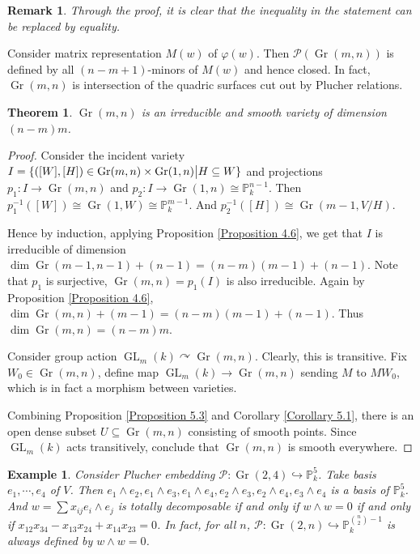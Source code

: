 \documentclass{ctexart}
\newtheorem{remark}{Remark}[section]
\newtheorem{theorem}{Theorem}[section]
\newtheorem{example}{Example}[section]
\newcommand{\grassmannianscheme}[2]{\operatorname{Gr}(#1, #2)}
\newcommand{\generallineargroup}[2]{\operatorname{GL}_{#1}(#2)}
\begin{document}
\begin{remark}
    Through the proof, it is clear that the inequality in the statement can be replaced by equality.
\end{remark}
Consider matrix representation $M(w)$ of $\varphi(w)$.
Then $\mathcal{P}(\grassmannianscheme{m}{n})$ is defined by all $(n - m + 1)$-minors of $M(w)$ and hence closed.
In fact, $\grassmannianscheme{m}{n}$ is intersection of the quadric surfaces cut out by Plucher relations.
\begin{theorem}
    $\grassmannianscheme{m}{n}$ is an irreducible and smooth variety of dimension $(n - m)m$.
    \label{Theorem 6.1}
\end{theorem}
\begin{proof}
    Consider the incident variety $I = \{([W], [H])\in \grassmannianscheme{m}{n} \times \grassmannianscheme{1}{n} \big{|} H \subseteq W\}$ and projections $p_{1}: I \rightarrow \grassmannianscheme{m}{n}$ and $p_{2}: I \rightarrow \grassmannianscheme{1}{n} \cong \mathbb{P}_{k}^{n - 1}$.
    Then $p_{1}^{-1}([W]) \cong \grassmannianscheme{1}{W} \cong \mathbb{P}_{k}^{m - 1}$.
    And $p_{2}^{-1}([H]) \cong \grassmannianscheme{m - 1}{V/H}$.
    \par
    Hence by induction, applying Proposition \ref{Proposition 4.6}, we get that $I$ is irreducible of dimension $\dim \grassmannianscheme{m - 1}{n - 1} + (n - 1) = (n - m)(m - 1) + (n - 1)$.
    Note that $p_{1}$ is surjective, $\grassmannianscheme{m}{n} = p_{1}(I)$ is also irreducible.
    Again by Proposition \ref{Proposition 4.6}, $\dim \grassmannianscheme{m}{n} + (m - 1) = (n - m)(m - 1) + (n - 1)$.
    Thus $\dim \grassmannianscheme{m}{n} = (n - m)m$.
    \par
    Consider group action $\generallineargroup{m}{k} \curvearrowright \grassmannianscheme{m}{n}$.
    Clearly, this is transitive.
    Fix $W_{0}\in \grassmannianscheme{m}{n}$, define map $\generallineargroup{m}{k} \rightarrow \grassmannianscheme{m}{n}$ sending $M$ to $MW_{0}$,
    which is in fact a morphism between varieties.
    \par
    Combining Proposition \ref{Proposition 5.3} and Corollary \ref{Corollary 5.1}, there is an open dense subset $U \subseteq \grassmannianscheme{m}{n}$ consisting of smooth points.
    Since $\generallineargroup{m}{k}$ acts transitively, conclude that $\grassmannianscheme{m}{n}$ is smooth everywhere.
\end{proof}
\begin{example}
    Consider Plucher embedding $\mathcal{P}: \grassmannianscheme{2}{4} \hookrightarrow \mathbb{P}_{k}^{5}$.
    Take basis $e_{1}, \cdots, e_{4}$ of $V$.
    Then $e_{1} \wedge e_{2}, e_{1} \wedge e_{3}, e_{1} \wedge e_{4}, e_{2} \wedge e_{3}, e_{2} \wedge e_{4}, e_{3} \wedge e_{4}$ is a basis of $\mathbb{P}_{k}^{5}$.
    And $w = \sum x_{ij}e_{i} \wedge e_{j}$ is totally decomposable if and only if $w \wedge w = 0$ if and only if $x_{12}x_{34} - x_{13}x_{24} + x_{14}x_{23} = 0$.
    In fact, for all $n$, $\mathcal{P}: \grassmannianscheme{2}{n} \hookrightarrow \mathbb{P}_{k}^{\binom{n}{2} - 1}$ is always defined by $w \wedge w = 0$. 
\end{example}
\end{document}
